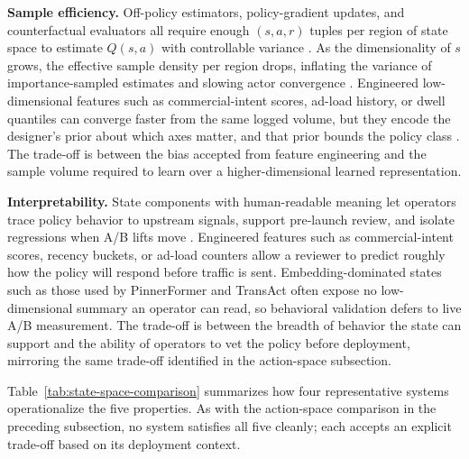 \documentclass[manuscript,review,screen]{acmart}
\begin{document}
\textbf{Sample efficiency.} Off-policy estimators, policy-gradient updates, and counterfactual evaluators all require enough $(s, a, r)$ tuples per region of state space to estimate $Q(s, a)$ with controllable variance \cite{swaminathan2015counterfactual, levine2020offline}. As the dimensionality of $s$ grows, the effective sample density per region drops, inflating the variance of importance-sampled estimates and slowing actor convergence \cite{dulac2021challenges}. Engineered low-dimensional features such as commercial-intent scores, ad-load history, or dwell quantiles can converge faster from the same logged volume, but they encode the designer's prior about which axes matter, and that prior bounds the policy class \cite{zhao2021dear}. The trade-off is between the bias accepted from feature engineering and the sample volume required to learn over a higher-dimensional learned representation.

\textbf{Interpretability.} State components with human-readable meaning let operators trace policy behavior to upstream signals, support pre-launch review, and isolate regressions when A/B lifts move \cite{gauci2018horizon, glanois2024survey}. Engineered features such as commercial-intent scores, recency buckets, or ad-load counters allow a reviewer to predict roughly how the policy will respond before traffic is sent. Embedding-dominated states such as those used by PinnerFormer \cite{pancha2022pinnerformer} and TransAct \cite{xia2023transact} often expose no low-dimensional summary an operator can read, so behavioral validation defers to live A/B measurement. The trade-off is between the breadth of behavior the state can support and the ability of operators to vet the policy before deployment, mirroring the same trade-off identified in the action-space subsection.

Table~\ref{tab:state-space-comparison} summarizes how four representative systems operationalize the five properties. As with the action-space comparison in the preceding subsection, no system satisfies all five cleanly; each accepts an explicit trade-off based on its deployment context.
\end{document}
